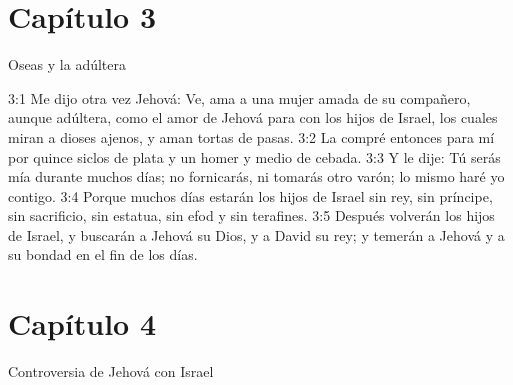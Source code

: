 	\section*{Capítulo 3 }
		Oseas y la adúltera 
		
		3:1 Me dijo otra vez Jehová: Ve, ama a una mujer amada de su compañero, aunque adúltera, como el amor de Jehová para con los hijos de Israel, los cuales miran a dioses ajenos, y aman tortas de pasas. 
		3:2 La compré entonces para mí por quince siclos de plata y un homer y medio de cebada. 
		3:3 Y le dije: Tú serás mía durante muchos días; no fornicarás, ni tomarás otro varón; lo mismo haré yo contigo. 
		3:4 Porque muchos días estarán los hijos de Israel sin rey, sin príncipe, sin sacrificio, sin estatua, sin efod y sin terafines. 
		3:5 Después volverán los hijos de Israel, y buscarán a Jehová su Dios, y a David su rey; y temerán a Jehová y a su bondad en el fin de los días. 
		\section*{Capítulo 4 }
			Controversia de Jehová con Israel 
			
